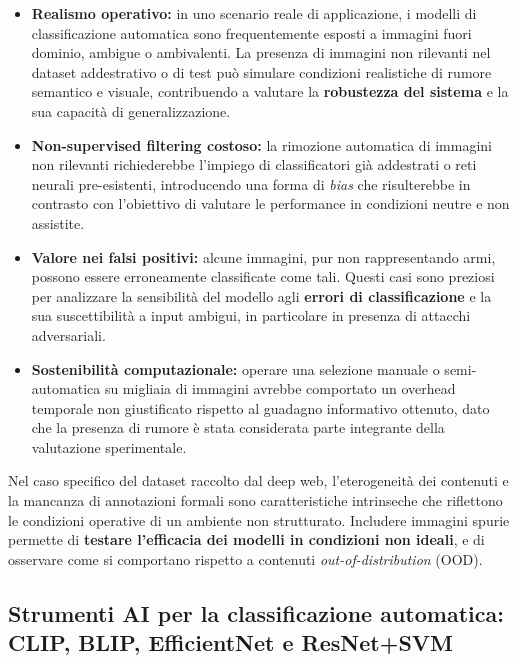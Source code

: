 \begin{itemize}
\item \textbf{Realismo operativo:} in uno scenario reale di applicazione, i modelli di classificazione automatica sono frequentemente esposti a immagini fuori dominio, ambigue o ambivalenti. La presenza di immagini non rilevanti nel dataset addestrativo o di test può simulare condizioni realistiche di rumore semantico e visuale, contribuendo a valutare la \textbf{robustezza del sistema} e la sua capacità di generalizzazione.

\item \textbf{Non-supervised filtering costoso:} la rimozione automatica di immagini non rilevanti richiederebbe l’impiego di classificatori già addestrati o reti neurali pre-esistenti, introducendo una forma di \textit{bias} che risulterebbe in contrasto con l'obiettivo di valutare le performance in condizioni neutre e non assistite.

\item \textbf{Valore nei falsi positivi:} alcune immagini, pur non rappresentando armi, possono essere erroneamente classificate come tali. Questi casi sono preziosi per analizzare la sensibilità del modello agli \textbf{errori di classificazione} e la sua suscettibilità a input ambigui, in particolare in presenza di attacchi adversariali.

\item \textbf{Sostenibilità computazionale:} operare una selezione manuale o semi-automatica su migliaia di immagini avrebbe comportato un overhead temporale non giustificato rispetto al guadagno informativo ottenuto, dato che la presenza di rumore è stata considerata parte integrante della valutazione sperimentale.
\end{itemize}

Nel caso specifico del dataset raccolto dal deep web, l’eterogeneità dei contenuti e la mancanza di annotazioni formali sono caratteristiche intrinseche che riflettono le condizioni operative di un ambiente non strutturato. Includere immagini spurie permette di \textbf{testare l'efficacia dei modelli in condizioni non ideali}, e di osservare come si comportano rispetto a contenuti \textit{out-of-distribution} (OOD).





\subsection{Strumenti AI per la classificazione automatica: CLIP, BLIP, EfficientNet e ResNet+SVM}
\label{sec:modelli-ai-classificazione}

